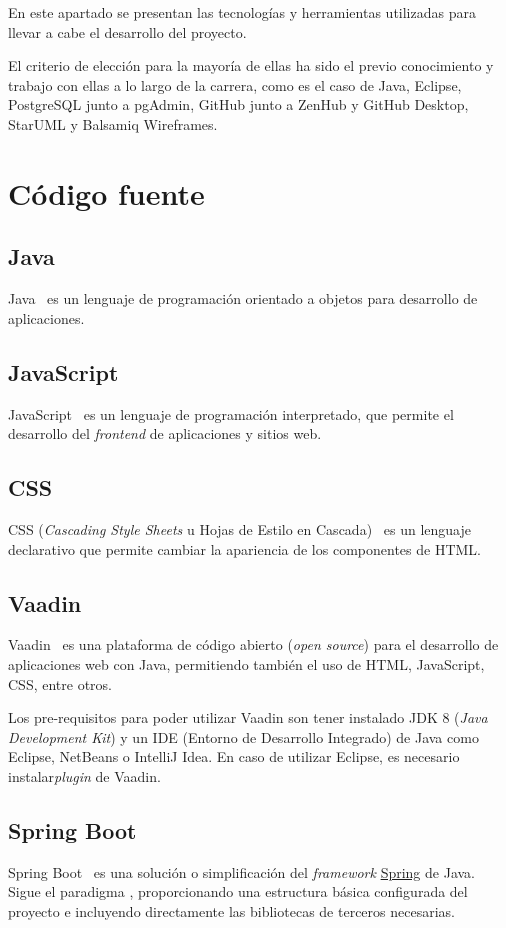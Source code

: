 
En este apartado se presentan las tecnologías y herramientas utilizadas para llevar a cabe el desarrollo del proyecto.

El criterio de elección para la mayoría de ellas ha sido el previo conocimiento y trabajo con ellas a lo largo de la carrera, como es el caso de Java, Eclipse, PostgreSQL junto a pgAdmin, GitHub junto a ZenHub y GitHub Desktop, StarUML y Balsamiq Wireframes.


\section{Código fuente}
\subsection{Java}
Java~\cite{pagina_java} es un lenguaje de programación orientado a objetos para desarrollo de aplicaciones.

\subsection{JavaScript}
JavaScript~\cite{pagina_javascript} es un lenguaje de programación interpretado, que permite el desarrollo del \textit{frontend} de aplicaciones y sitios web.

\subsection{CSS}
CSS (\textit{Cascading Style Sheets} u Hojas de Estilo en Cascada)~\cite{css} es un lenguaje declarativo que permite cambiar la apariencia de los componentes de HTML.

\subsection{Vaadin}
Vaadin~\cite{pagina_vaadin} es una plataforma de código abierto (\textit{open source}) para el desarrollo de aplicaciones web con Java, permitiendo también el uso de HTML, JavaScript, CSS, entre otros.

Los pre-requisitos para poder utilizar Vaadin son tener instalado JDK 8 (\textit{Java Development Kit}) y un IDE (Entorno de Desarrollo Integrado) de Java como  Eclipse, NetBeans o IntelliJ Idea. En caso de utilizar Eclipse, es necesario instalar\textit{plugin} de Vaadin.

\subsection{Spring Boot}
Spring Boot~\cite{pagina_spring_boot} es una solución o simplificación del \textit{framework} \href{https://spring.io/}{Spring} de Java. Sigue el paradigma , proporcionando una estructura básica configurada del proyecto e incluyendo directamente las bibliotecas de terceros necesarias.

